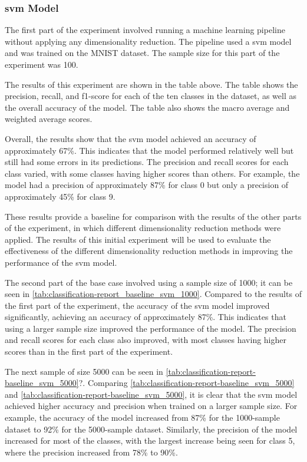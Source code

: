\subsubsection{svm Model}\label{subsubsec:experiment_4_no_dimmensionality_reduction}





The first part of the experiment involved running a machine learning pipeline without applying any dimensionality reduction. The pipeline used a \gls{svm} model and was trained on the MNIST dataset. The sample size for this part of the experiment was 100.

The results of this experiment are shown in the table above. The table shows the precision, recall, and f1-score for each of the ten classes in the dataset, as well as the overall accuracy of the model. The table also shows the macro average and weighted average scores.

Overall, the results show that the \gls{svm} model achieved an accuracy of approximately 67\%. This indicates that the model performed relatively well but still had some errors in its predictions. The precision and recall scores for each class varied, with some classes having higher scores than others. For example, the model had a precision of approximately 87\% for class 0 but only a precision of approximately 45\% for class 9.

These results provide a baseline for comparison with the results of the other parts of the experiment, in which different dimensionality reduction methods were applied. The results of this initial experiment will be used to evaluate the effectiveness of the different dimensionality reduction methods in improving the performance of the \gls{svm} model.

The second part of the base case involved using a sample size of 1000; it can be seen in \ref{tab:classification-report_baseline_svm_1000}. Compared to the results of the first part of the experiment, the accuracy of the \gls{svm} model improved significantly, achieving an accuracy of approximately 87\%. This indicates that using a larger sample size improved the performance of the model. The precision and recall scores for each class also improved, with most classes having higher scores than in the first part of the experiment.

The next sample of size 5000 can be seen in \ref{tab:classification-report-baseline_svm_5000}?.
Comparing \ref{tab:classification-report-baseline_svm_5000} and \ref{tab:classification-report-baseline_svm_5000}, it is clear that the \gls{svm} model achieved higher accuracy and precision when trained on a larger sample size. For example, the accuracy of the model increased from 87\% for the 1000-sample dataset to 92\% for the 5000-sample dataset. Similarly, the precision of the model increased for most of the classes, with the largest increase being seen for class 5, where the precision increased from 78\% to 90\%.


